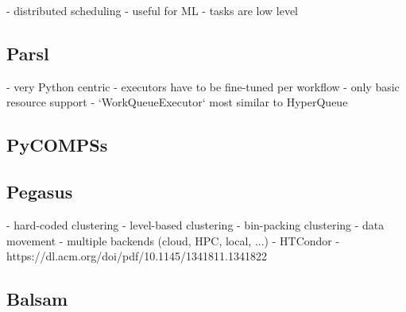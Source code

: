- distributed scheduling
- useful for ML
- tasks are low level

\subsection*{Parsl}

- very Python centric
- executors have to be fine-tuned per workflow
- only basic resource support
- `WorkQueueExecutor` most similar to HyperQueue

\subsection*{PyCOMPSs}

\subsection*{Pegasus}

- hard-coded clustering
- level-based clustering
- bin-packing clustering
- data movement
- multiple backends (cloud, HPC, local, ...)
- HTCondor
- https://dl.acm.org/doi/pdf/10.1145/1341811.1341822

\subsection*{Balsam}


